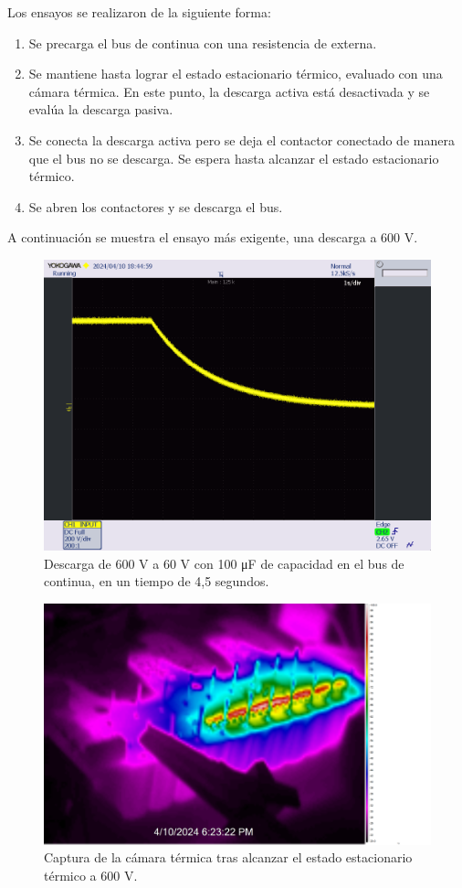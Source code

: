 Los ensayos se realizaron de la siguiente forma: 

\begin{enumerate}
	\item Se precarga el bus de continua con una resistencia de externa.
	\item Se mantiene hasta lograr el estado estacionario térmico, evaluado con una cámara térmica. En este punto, la descarga activa está desactivada y se evalúa la descarga pasiva.
	\item Se conecta la descarga activa pero se deja el contactor conectado de manera que el bus no se descarga. Se espera hasta alcanzar el estado estacionario térmico.
	\item Se abren los contactores y se descarga el bus.
\end{enumerate}

A continuación se muestra el ensayo más exigente, una descarga a 600 V.

\begin{figure}[H]
	\centering
	\includegraphics[width=0.7\linewidth]{fig/dischargeGuapo}
	\caption{Descarga de 600 V a 60 V con 100 \unit{\micro\farad} de capacidad en el bus de continua, en un tiempo de 4,5 segundos.}
\end{figure}

\begin{figure}[H]
	\centering
	\includegraphics[width=0.7\linewidth]{fig/dischargeGuapisimo}
	\caption{Captura de la cámara térmica tras alcanzar el estado estacionario térmico a 600 V.}
\end{figure}



